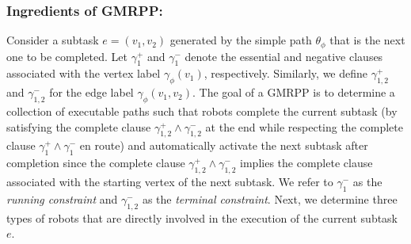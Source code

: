 \documentclass[Afour,sageh,times]{sagej}
\begin{document}
{{ \subsubsection{Ingredients of GMRPP:}\label{sec:gmmpp1} Consider a subtask $e = (v_1, v_2)$ generated by the simple path $\theta_{\phi}$ that is the next one to be completed. Let $\gamma_1^+$ and $\gamma_1^-$ denote the essential and negative clauses associated with the vertex label $\gamma_\phi(v_1)$, respectively. Similarly, we define $\gamma_{1,2}^{+}$ and $\gamma_{1,2}^{-}$  for the edge label $\gamma_\phi(v_1, v_2)$. The goal of a GMRPP   is to determine a collection of executable paths such that robots complete the current subtask (by satisfying the complete clause  $\gamma_{1,2}^+ \wedge \gamma_{1,2}^-$ at the end while respecting the complete clause $\gamma_1^+ \wedge \gamma_1^-$ en route) and automatically activate the next subtask after completion since the complete clause $\gamma_{1,2}^+ \wedge \gamma_{1,2}^-$ implies the complete clause associated with the starting vertex of the next subtask. We refer to $\gamma_1^-$ as the {\it running constraint} and $\gamma_{1,2}^- $  as the {\it terminal constraint}. Next, we determine three types of robots that are directly involved in the execution of the current subtask $e$.



}}
\end{document}

